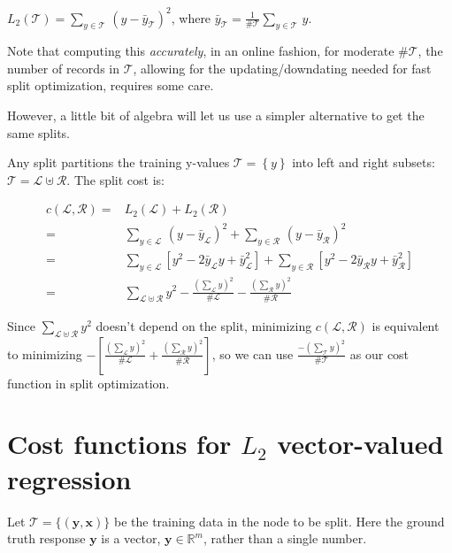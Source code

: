 $L_{2}\left(\mathcal{T}\right)
= \sum_{y\in\mathcal{T}}\,
\left(y-\bar{y}_{\mathcal{T}}\right)^{2}$,
where $\bar{y}_{\mathcal{T}}
= \frac{1}{\#\mathcal{T}}\sum_{y\in\mathcal{T}}\,y$.

Note that computing this \textit{accurately}, 
in an online fashion, for
moderate $\#\mathcal{T}$, the number of records in $\mathcal{T}$, 
allowing for
the updating/downdating needed for fast split optimization, 
requires some care. 

However, a little bit of algebra will let us use a simpler 
alternative to get the same splits. 


Any split partitions the training y-values
$\mathcal{T=}\left\{ y\right\} $ into left and right subsets: 
$\mathcal{T}=\mathcal{L}\uplus\mathcal{R}$.
The split cost is:

\begin{align*}
c\left(\mathcal{L},\mathcal{R}\right)= & 
L_{2}\left(\mathcal{L}\right)
+ L_{2}\left(\mathcal{R}\right)\\
= & \sum_{y\in\mathcal{L}}\,
\left(y-\bar{y}_{\mathcal{L}}\right)^{2}
+
\sum_{y\in\mathcal{R}}\,\left(y-\bar{y}_{\mathcal{R}}\right)^{2}\\
= & \sum_{y\in\mathcal{L}}\left[y^{2}-2\bar{y}_{\mathcal{L}}y
+
\bar{y}_{\mathcal{L}}^{2}\right]
+
\sum_{y\in\mathcal{R}}\left[y^{2}-2\bar{y}_{\mathcal{R}}y
+
\bar{y}_{\mathcal{R}}^{2}\right]\\
= & \sum_{\mathcal{L}\uplus\mathcal{R}}y^{2}
-
\frac{\left(\sum_{\mathcal{L}}y\right)^{2}}{\#\mathcal{L}}
-
\frac{\left(\sum_{\mathcal{R}}y\right)^{2}}{\#\mathcal{R}}
\end{align*}

Since $\sum_{\mathcal{L}\uplus\mathcal{R}}y^{2}$ doesn't 
depend on the split, minimizing 
$c\left(\mathcal{L},\mathcal{R}\right)$ is
equivalent to minimizing 
$-\left[\frac{\left(\sum_{\mathcal{L}}y\right)^{2}}{\#\mathcal{L}}
+
\frac{\left(\sum_{\mathcal{R}}y\right)^{2}}{\#\mathcal{R}}\right]$, 
so we can use 
$\frac{-\left(\sum_{\mathcal{T}}y\right)^{2}}{\#\mathcal{T}}$
as our cost function in split optimization.

\section{Cost functions for $L_2$ vector-valued regression}

Let $\mathcal{T} = \{ \left( \mathbf{y}, \mathbf{x} \right) \}$
be the training data in the node to be split.
Here the ground truth response $\mathbf{y}$ is a vector, 
$\mathbf{y}\in\mathbb{R}^m$, rather than a single number.


